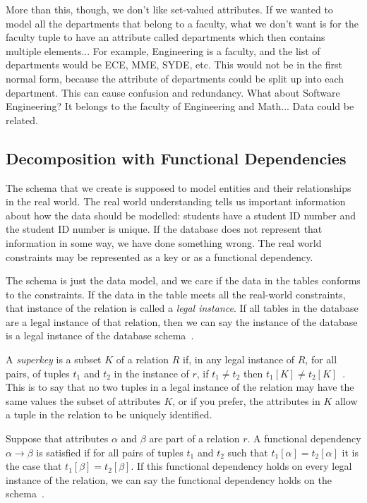 \documentclass[a4paper]{report}
\begin{document}
More than this, though, we don't like set-valued attributes. If we wanted to model all the departments that belong to a faculty, what we don't want is for the faculty tuple to have an attribute called departments which then contains multiple elements... For example, Engineering is a faculty, and the list of departments would be ECE, MME, SYDE, etc. This would not be in the first normal form, because the attribute of departments could be split up into each department. This can cause confusion and redundancy. What about Software Engineering? It belongs to the faculty of Engineering and Math... Data could be related.

\subsection*{Decomposition with Functional Dependencies}

The schema that we create is supposed to model entities and their relationships in the real world. The real world understanding tells us important information about how the data should be modelled: students have a student ID number and the student ID number is unique. If the database does not represent that information in some way, we have done something wrong. The real world constraints may be represented as a key or as a functional dependency.

The schema is just the data model, and we care if the data in the tables conforms to the constraints. If the data in the table meets all the real-world constraints, that instance of the relation is called a \textit{legal instance}. If all tables in the database are a legal instance of that relation, then we can say the instance of the database is a legal instance of the database schema~\cite{dsc}.

A \textit{superkey} is a subset $K$ of a relation $R$ if, in any legal instance of $R$, for all pairs, of tuples $t_{1}$ and $t_{2}$ in the instance of $r$, if $t_{1} \neq t_{2}$ then $t_{1}[K] \neq t_{2}[K]$~\cite{dsc}. This is to say that no two tuples in a legal instance of the relation may have the same values the subset of attributes $K$, or if you prefer, the attributes in $K$ allow a tuple in the relation to be uniquely identified.

Suppose that attributes $\alpha$ and $\beta$ are part of a relation $r$. A functional dependency $\alpha \rightarrow \beta$ is satisfied if for all pairs of tuples $t_{1}$ and $t_{2}$ such that $t_{1}[\alpha] = t_{2}[\alpha]$ it is the case that $t_{1}[\beta] = t_{2}[\beta]$. If this functional dependency holds on every legal instance of the relation, we can say the functional dependency holds on the schema~\cite{dsc}.
\end{document}
